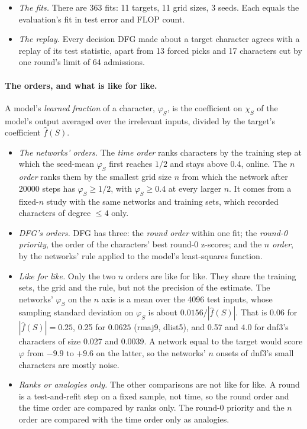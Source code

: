 \begin{itemize}
\item \emph{The fits.} There are 363 fits: 11 targets, 11 grid sizes, 3 seeds. Each equals the evaluation's fit in test error and FLOP count.
\item \emph{The replay.} Every decision DFG made about a target character agrees with a replay of its test statistic, apart from 13 forced picks and 17 characters cut by one round's limit of 64 admissions.
\end{itemize}

\paragraph{The orders, and what is like for like.} A model's \emph{learned fraction} of a character, $\varphi_S$, is the coefficient on $\chi_S$ of the model's output averaged over the irrelevant inputs, divided by the target's coefficient $\hat f(S)$.
\begin{itemize}
\item \emph{The networks' orders.} The \emph{time order} ranks characters by the training step at which the seed-mean $\varphi_S$ first reaches $1/2$ and stays above 0.4, online. The \emph{$n$ order} ranks them by the smallest grid size $n$ from which the network after 20000 steps has $\varphi_S\ge1/2$, with $\varphi_S\ge0.4$ at every larger $n$. It comes from a fixed-$n$ study with the same networks and training sets, which recorded characters of degree $\le4$ only.
\item \emph{DFG's orders.} DFG has three: the \emph{round order} within one fit; the \emph{round-0 priority}, the order of the characters' best round-0 z-scores; and the \emph{$n$ order}, by the networks' rule applied to the model's least-squares function.
\item \emph{Like for like.} Only the two $n$ orders are like for like. They share the training sets, the grid and the rule, but not the precision of the estimate. The networks' $\varphi_S$ on the $n$ axis is a mean over the 4096 test inputs, whose sampling standard deviation on $\varphi_S$ is about $0.0156/|\hat f(S)|$. That is 0.06 for $|\hat f(S)|=0.25$, 0.25 for $0.0625$ (rmaj9, dlist5), and 0.57 and 4.0 for dnf3's characters of size 0.027 and 0.0039. A network equal to the target would score $\varphi$ from $-9.9$ to $+9.6$ on the latter, so the networks' $n$ onsets of dnf3's small characters are mostly noise.
\item \emph{Ranks or analogies only.} The other comparisons are not like for like. A round is a test-and-refit step on a fixed sample, not time, so the round order and the time order are compared by ranks only. The round-0 priority and the $n$ order are compared with the time order only as analogies.
\end{itemize}

